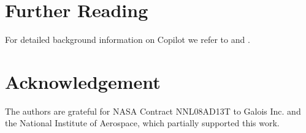 \documentclass[]{article}
\theoremstyle{example}
\begin{document}
\section*{Further Reading}

For detailed background information on Copilot we refer to \cite{PikeGoodloe2010} and \cite{PikeGoodloe2011}.

\section*{Acknowledgement}

The authors are grateful for NASA Contract NNL08AD13T to Galois Inc. and the
National Institute of Aerospace, which partially supported this work.

{


}
\end{document}
